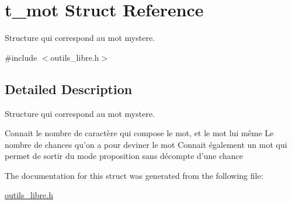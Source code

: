 \hypertarget{structt__mot}{\section{t\-\_\-mot Struct Reference}
\label{structt__mot}
}


Structure qui correspond au mot mystere.  




{\ttfamily \#include $<$outils\-\_\-libre.\-h$>$}



\subsection{Detailed Description}
Structure qui correspond au mot mystere. 

Connait le nombre de caractère qui compose le mot, et le mot lui même Le nombre de chances qu'on a pour deviner le mot Connait également un mot qui permet de sortir du mode proposition sans décompte d'une chance 

The documentation for this struct was generated from the following file\-:\begin{DoxyCompactItemize}
\item 
\hyperlink{outils__libre_8h}{outils\-\_\-libre.\-h}\end{DoxyCompactItemize}
